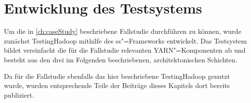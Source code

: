\chapter{Entwicklung des Testsystems}
\label{ch:model}

Um die in \cref{ch:caseStudy} beschriebene Fallstudie durchführen zu können, wurde zunächst TestingHadoop mithilfe des \gls{ss}"=Frameworks entwickelt.
Das Testsystem bildet \uA vereinfacht die für die Fallstudie relevanten YARN"=Komponenten ab und besteht aus den drei im Folgenden beschriebenen, architektonischen Schichten.

Da für die Fallstudie \cite{Eberhardinger2018} ebenfalls das hier beschriebene TestingHadoop genutzt wurde, wurden entsprechende Teile der Beiträge dieses Kapitels dort bereits publiziert.









